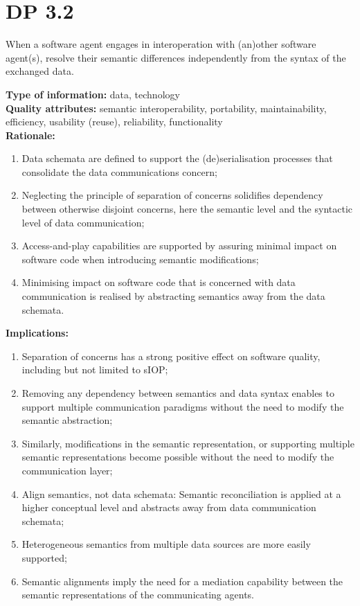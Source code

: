 \documentclass[sort&compress,preprint,authoryear,3p,twocolumn]{elsarticle}
\begin{document}
\hypertarget{dp-3.2}{%
\section{DP 3.2}\label{dp-3.2}}

\begin{mmdp}\label{dp:ssoc}

When a software agent engages in interoperation with (an)other software agent(s), resolve their semantic differences independently from the syntax of the exchanged data.   

\textbf{Type of information:} data, technology  \\
\textbf{Quality attributes:} semantic interoperability, portability, maintainability, efficiency, usability (reuse), reliability, functionality   \\
\textbf{Rationale:}
\begin{enumerate}
  \item Data schemata are defined to support the (de)serialisation processes that consolidate the data communications concern;
  \item Neglecting the principle of separation of concerns solidifies dependency between otherwise disjoint concerns, here the semantic level and the syntactic level of data communication;
  \item Access-and-play capabilities are supported by assuring minimal impact on software code when introducing semantic modifications;
  \item Minimising impact on software code that is concerned with data communication is realised by abstracting semantics away from the data schemata.
\end{enumerate}
\textbf{Implications:}
\begin{enumerate}
  \item Separation of concerns has a strong positive effect on software quality, including but not limited to sIOP;
  \item Removing any dependency between semantics and data syntax enables to support multiple communication paradigms without the need to modify the semantic abstraction;
  \item Similarly, modifications in the semantic representation, or supporting multiple semantic representations become possible without the need to modify the communication layer;
  \item Align semantics, not data schemata: Semantic reconciliation is applied at a higher conceptual level and abstracts away from data communication schemata;
  \item Heterogeneous semantics from multiple data sources are more easily supported;
  \item Semantic alignments imply the need for a mediation capability between the semantic representations of the communicating agents.
\end{enumerate}  
\end{mmdp}
\end{document}
